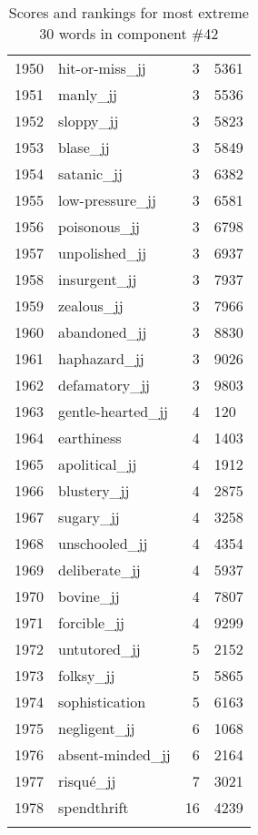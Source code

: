 \begin{longtable}[!htbp]{| rlr@{.}l |}
    1950 & hit-or-miss\_jj & 3 & 5361 \\
    1951 & manly\_jj & 3 & 5536 \\
    1952 & sloppy\_jj & 3 & 5823 \\
    1953 & blase\_jj & 3 & 5849 \\
    1954 & satanic\_jj & 3 & 6382 \\
    1955 & low-pressure\_jj & 3 & 6581 \\
    1956 & poisonous\_jj & 3 & 6798 \\
    1957 & unpolished\_jj & 3 & 6937 \\
    1958 & insurgent\_jj & 3 & 7937 \\
    1959 & zealous\_jj & 3 & 7966 \\
    1960 & abandoned\_jj & 3 & 8830 \\
    1961 & haphazard\_jj & 3 & 9026 \\
    1962 & defamatory\_jj & 3 & 9803 \\
    1963 & gentle-hearted\_jj & 4 & 120 \\
    1964 & earthiness & 4 & 1403 \\
    1965 & apolitical\_jj & 4 & 1912 \\
    1966 & blustery\_jj & 4 & 2875 \\
    1967 & sugary\_jj & 4 & 3258 \\
    1968 & unschooled\_jj & 4 & 4354 \\
    1969 & deliberate\_jj & 4 & 5937 \\
    1970 & bovine\_jj & 4 & 7807 \\
    1971 & forcible\_jj & 4 & 9299 \\
    1972 & untutored\_jj & 5 & 2152 \\
    1973 & folksy\_jj & 5 & 5865 \\
    1974 & sophistication & 5 & 6163 \\
    1975 & negligent\_jj & 6 & 1068 \\
    1976 & absent-minded\_jj & 6 & 2164 \\
    1977 & risqué\_jj & 7 & 3021 \\
    1978 & spendthrift & 16 & 4239 \\
    \hline
    \caption{Scores and rankings for most extreme 30 words in component \#42} \\
\end{longtable}

